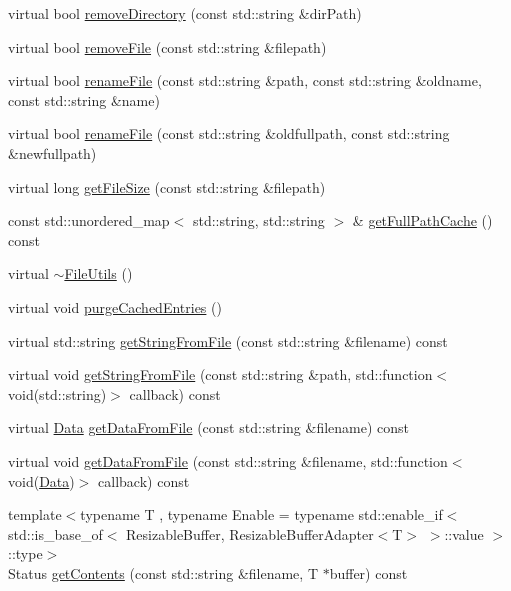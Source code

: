 \begin{DoxyCompactItemize}
\item 
virtual bool \hyperlink{classFileUtils_ad64d866c014013817c54582924f9592e}{remove\+Directory} (const std\+::string \&dir\+Path)
\item 
virtual bool \hyperlink{classFileUtils_aee725bf84f7bc707f9a94543d75b70fb}{remove\+File} (const std\+::string \&filepath)
\item 
virtual bool \hyperlink{classFileUtils_a9f7560060b9909e1af2e0a77923f61ac}{rename\+File} (const std\+::string \&path, const std\+::string \&oldname, const std\+::string \&name)
\item 
virtual bool \hyperlink{classFileUtils_a5a73b69c8322c48c3fbad2a262d354d8}{rename\+File} (const std\+::string \&oldfullpath, const std\+::string \&newfullpath)
\item 
virtual long \hyperlink{classFileUtils_a1804c928fb8897e07e181a8e72362e0a}{get\+File\+Size} (const std\+::string \&filepath)
\item 
const std\+::unordered\+\_\+map$<$ std\+::string, std\+::string $>$ \& \hyperlink{classFileUtils_a79f4f099ea02d95e5d90425f038fb9d3}{get\+Full\+Path\+Cache} () const
\item 
virtual \hyperlink{classFileUtils_a5e36e104e5d2c7adf7b50dff0a75b437}{$\sim$\+File\+Utils} ()
\item 
virtual void \hyperlink{classFileUtils_a344792c0707b0089493f7b39f2ad57d9}{purge\+Cached\+Entries} ()
\item 
virtual std\+::string \hyperlink{classFileUtils_a72a478f88775c6de04114c396971285e}{get\+String\+From\+File} (const std\+::string \&filename) const
\item 
virtual void \hyperlink{classFileUtils_a510afb98fe877771b610e9cbad94849a}{get\+String\+From\+File} (const std\+::string \&path, std\+::function$<$ void(std\+::string)$>$ callback) const
\item 
virtual \hyperlink{classData}{Data} \hyperlink{classFileUtils_ac59d79a67f7ce17ce47db607bba31ed7}{get\+Data\+From\+File} (const std\+::string \&filename) const
\item 
virtual void \hyperlink{classFileUtils_a1a2683fad8f40963f4ffa382ad47fca4}{get\+Data\+From\+File} (const std\+::string \&filename, std\+::function$<$ void(\hyperlink{classData}{Data})$>$ callback) const
\item 
{\footnotesize template$<$typename T , typename Enable  = typename std\+::enable\+\_\+if$<$            std\+::is\+\_\+base\+\_\+of$<$ Resizable\+Buffer, Resizable\+Buffer\+Adapter$<$\+T$>$ $>$\+::value        $>$\+::type$>$ }\\Status \hyperlink{classFileUtils_a8673a6529c3b2abcdbefbadd647ae139}{get\+Contents} (const std\+::string \&filename, T $\ast$buffer) const

\end{DoxyCompactItemize}
